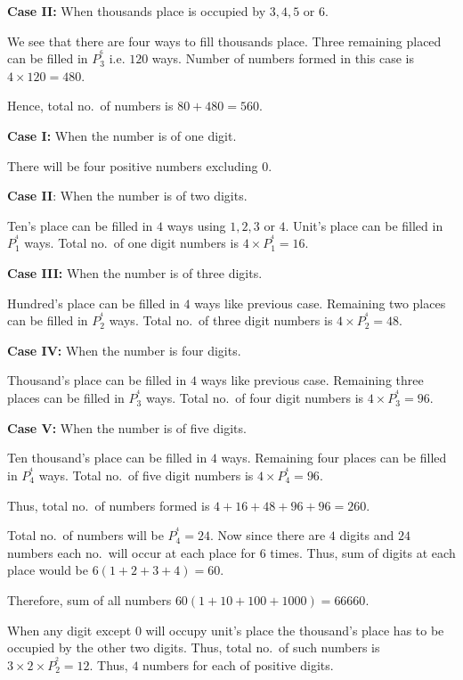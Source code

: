   {\bf Case II:} When thousands place is occupied by $3, 4, 5$ or $6$.

  We see that there are four ways to fill thousands place. Three remaining placed can be filled in $P_3^^6$
  i.e. $120$ ways. Number of numbers formed in this case is $4\times 120 = 480$.

  Hence, total no.\ of numbers is $80 + 480 = 560$.
\item {\bf Case I:} When the number is of one digit.

  There will be four positive numbers excluding $0$.

  {\bf Case II}: When the number is of two digits.

  Ten's place can be filled in $4$ ways using $1, 2, 3$ or $4$. Unit's place can be filled in $P_1^^4$
  ways. Total no.\ of one digit numbers is $4\times P_1^^4 = 16$.

  {\bf Case III:} When the number is of three digits.

  Hundred's place can be filled in $4$ ways like previous case. Remaining two places can be filled in
  $P_2^^4$ ways. Total no.\ of three digit numbers is $4\times P_2^^4 = 48$.

  {\bf Case IV:} When the number is four digits.

  Thousand's place can be filled in $4$ ways like previous case. Remaining three places can be filled in
  $P_3^^4$ ways. Total no.\ of four digit numbers is $4\times P_3^^4 = 96$.

  {\bf Case V:} When the number is of five digits.

  Ten thousand's place can be filled in $4$ ways. Remaining four places can be filled in $P_4^^4$
  ways. Total no.\ of five digit numbers is $4\times P_4^^4 = 96$.

  Thus, total no.\ of numbers formed is $4 + 16 + 48 + 96 + 96 = 260$.
\item Total no.\ of numbers will be $P_4^^4 = 24$. Now since there are $4$ digits and $24$ numbers each
  no.\ will occur at each place for $6$ times. Thus, sum of digits at each place would be $6(1 + 2 + 3 + 4) =
  60$.

  Therefore, sum of all numbers $60(1 + 10 + 100 + 1000) = 66660$.
\item When any digit except $0$ will occupy unit's place the thousand's place has to be occupied by the
  other two digits. Thus, total no.\ of such numbers is $3\times2\times P_2^^2 = 12$. Thus, $4$ numbers for
  each of positive digits.

